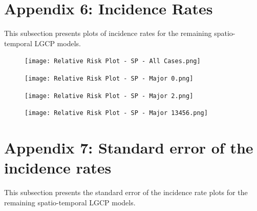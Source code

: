 \documentclass[12pt,a4paper]{report}
\begin{document}
\newpage

\section*{Appendix 6: Incidence Rates}

This subsection presents plots of incidence rates for the remaining spatio-temporal LGCP models. 

\begin{figure}[H]
\begin{center}
\texttt{[image: Relative Risk Plot - SP - All Cases.png]}
\end{center}
\end{figure}

\begin{figure}[H]
\begin{center}
\texttt{[image: Relative Risk Plot - SP - Major 0.png]}
\end{center}
\end{figure}

\begin{figure}[H]
\begin{center}
\texttt{[image: Relative Risk Plot - SP - Major 2.png]}
\end{center}
\end{figure}

\begin{figure}[H]
\begin{center}
\texttt{[image: Relative Risk Plot - SP - Major 13456.png]}
\end{center}
\end{figure}

\newpage

\section*{Appendix 7: Standard error of the incidence rates}

This subsection presents the standard error of the incidence rate plots for the remaining spatio-temporal LGCP models.
\end{document}
